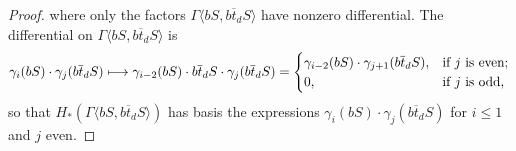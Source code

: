 \documentclass[11pt]{article}
\begin{document}
\begin{DimZeroPart}
\begin{proof}
where only the factors $\Gamma\langle bS,b\overline{t}_dS\rangle$ have nonzero differential. The differential on $\Gamma\langle bS,b\overline{t}_dS\rangle$ is
\[\gamma_i( bS)\cdot\gamma_j(b\overline{t}_dS)\mapsto\gamma_{i-2}( bS)\cdot b\overline{t}_dS\cdot\gamma_j(b\overline{t}_dS)=\begin{cases}
\gamma_{i-2}(bS)\cdot\gamma_{j+1}(b\overline{t}_dS),&\textup{if }j\textup{ is even};\\
0,&\textup{if }j\textup{ is odd},
\end{cases}
\]
so that $H_*(\Gamma\langle bS,b\overline{t}_dS\rangle)$ has basis the expressions $\gamma_i(bS)\cdot\gamma_j(b\overline{t}_dS)$ for $i\leq1$ and $j$ even.
\end{proof}




\end{DimZeroPart}
\begin{Endmatter}
\printbibliography
\end{Endmatter}
\end{document}
